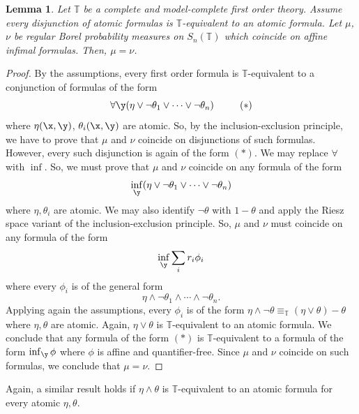 \documentclass[12pt]{article}
\newtheorem{lemma}[theorem]{Lemma}
\begin{document}
\begin{lemma}\label{existential values}
Let $\mathbb T$ be a complete and model-complete first order theory. Assume every disjunction of atomic formulas is
$\mathbb{T}$-equivalent to an atomic formula. Let $\mu$, $\nu$ be regular Borel probability measures on
$S_n(\mathbb{T})$ which coincide on affine infimal formulas.
Then, $\mu=\nu$.
\end{lemma}
\begin{proof}
By the assumptions, every first order formula is $\mathbb{T}$-equivalent to a conjunction of formulas of the form
$$\forall\y(\eta\vee\neg\theta_1\vee\cdots\vee\neg\theta_n)\ \ \ \ \ \ \ \ (*)$$
where $\eta(\x,\y)$, $\theta_i(\x,\y)$ are atomic.
So, by the inclusion-exclusion principle, we have to prove that $\mu$ and $\nu$ coincide on
disjunctions of such formulas. However, every such disjunction is again of the form $(*)$.
We may replace $\forall$ with $\inf$. So, we must prove that $\mu$ and $\nu$
coincide on any formula of the form
$$\inf_{\y}(\eta\vee\neg\theta_1\vee\cdots\vee\neg\theta_n)$$
where $\eta,\theta_i$ are atomic.
We may also identify $\neg\theta$ with $1-\theta$
and apply the Riesz space variant of the inclusion-exclusion principle.
So, $\mu$ and $\nu$ must coincide on any formula of the form
$$\inf_{\y}\sum_i r_i\phi_i$$ where every $\phi_i$ is of the general form
$$\eta\wedge\neg\theta_1\wedge\cdots\wedge\neg\theta_n.$$
Applying again the assumptions, every $\phi_i$ is of the form
$\eta\wedge\neg\theta\equiv_{\mathbb T}(\eta\vee\theta)-\theta$
where $\eta,\theta$ are atomic.
Again, $\eta\vee\theta$ is $\mathbb T$-equivalent to an atomic formula.
We conclude that any formula of the form $(*)$ is $\mathbb{T}$-equivalent
to a formula of the form $\inf_{\y}\phi$ where $\phi$ is affine and quantifier-free.
Since $\mu$ and $\nu$ coincide on such formulas, we conclude that $\mu=\nu$.
\end{proof}

Again, a similar result holds if $\eta\wedge\theta$ is $\mathbb{T}$-equivalent
to an atomic formula for every atomic $\eta,\theta$.
\end{document}
